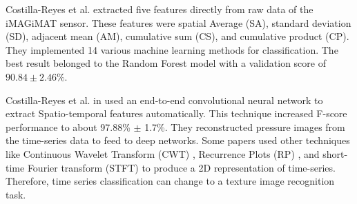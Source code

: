 Costilla-Reyes et al. \cite{Costilla-Reyes2016TemporalSystem} extracted five features directly from raw data of the iMAGiMAT sensor. These features were spatial Average (SA), standard deviation (SD), adjacent mean (AM), cumulative sum (CS), and cumulative product (CP).
They implemented 14 various machine learning methods for classification. The best result belonged to the Random Forest model with a validation score of $90.84 \pm 2.46\%$. 

 
Costilla-Reyes et al. in \cite{Costilla-Reyes2018DeepSensors} used an end-to-end convolutional neural network to extract Spatio-temporal features automatically. This technique increased F-score performance to about 97.88\% $\pm$ 1.7\%. They reconstructed pressure images from the time-series data to feed to deep networks. Some papers used other techniques like Continuous Wavelet Transform (CWT) \cite{Wang2021AutomaticNetwork}, Recurrence Plots (RP) \cite{Hatami2017ClassificationNetworks}, and short-time Fourier transform (STFT) \cite{Huang2019ECGNetwork} to produce a 2D representation of time-series. Therefore, time series classification can change to a texture image recognition task.


 



